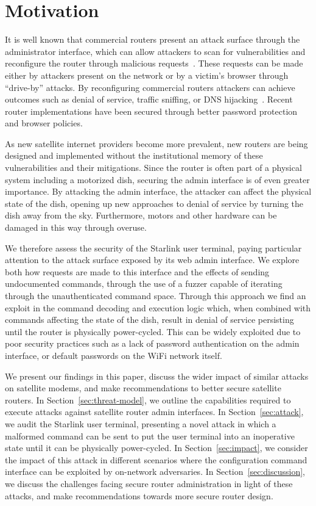 \section{Motivation}\label{sec:motivation}

It is well known that commercial routers present an attack surface through the administrator interface, which can allow attackers to scan for vulnerabilities and reconfigure the router through malicious requests~\cite{niemietz2015owning}.
These requests can be made either by attackers present on the network or by a victim's browser through ``drive-by'' attacks.
By reconfiguring commercial routers attackers can achieve outcomes such as denial of service, traffic sniffing, or DNS hijacking~\cite{jeitner2022xdri}.
Recent router implementations have been secured through better password protection and browser policies.

As new satellite internet providers become more prevalent, new routers are being designed and implemented without the institutional memory of these vulnerabilities and their mitigations.
Since the router is often part of a physical system including a motorized dish, securing the admin interface is of even greater importance.
By attacking the admin interface, the attacker can affect the physical state of the dish, opening up new approaches to denial of service by turning the dish away from the sky.
Furthermore, motors and other hardware can be damaged in this way through overuse.

We therefore assess the security of the Starlink user terminal, paying particular attention to the attack surface exposed by its web admin interface.
We explore both how requests are made to this interface and the effects of sending undocumented commands, through the use of a fuzzer capable of iterating through the unauthenticated command space.
Through this approach we find an exploit in the command decoding and execution logic which, when combined with commands affecting the state of the dish, result in denial of service persisting until the router is physically power-cycled.
This can be widely exploited due to poor security practices such as a lack of password authentication on the admin interface, or default passwords on the WiFi network itself.

We present our findings in this paper, discuss the wider impact of similar attacks on satellite modems, and make recommendations to better secure satellite routers.
In Section~\ref{sec:threat-model}, we outline the capabilities required to execute attacks against satellite router admin interfaces.
In Section~\ref{sec:attack}, we audit the Starlink user terminal, presenting a novel attack in which a malformed command can be sent to put the user terminal into an inoperative state until it can be physically power-cycled.
In Section~\ref{sec:impact}, we consider the impact of this attack in different scenarios where the configuration command interface can be exploited by on-network adversaries.
In Section~\ref{sec:discussion}, we discuss the challenges facing secure router administration in light of these attacks, and make recommendations towards more secure router design.
